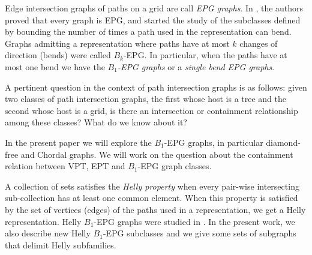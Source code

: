 \documentclass[9pt]{entcs}
\begin{document}
Edge intersection graphs of paths on a grid are call \textit{EPG graphs}. 
In \cite{golumbic2009}, the authors proved that every graph is EPG, and started the study of the subclasses
defined by bounding the number of times a path used in the representation can bend.  Graphs admitting a representation
where  paths  have at most $k$ changes of direction  (bends) were called $B_k$-EPG. 
 In particular, when the paths have at most one bend we have the \textit{ $B_1$-EPG graphs} or a \textit{single bend EPG graphs}.
 

 

 
 A pertinent question in the context of path intersection graphs is as follows: given two classes of path intersection graphs,
 the first whose host is a tree and the second whose host is a grid,  is there an intersection or containment relationship among these classes? What do we know about it?




In the present paper we will explore the $B_1$-EPG graphs, in particular diamond-free and Chordal graphs. We will work on the question about the containment
relation between  VPT, EPT and $B_1$-EPG graph classes.


 A collection  of sets satisfies the \textit{Helly property} when every pair-wise intersecting sub-collection  has at least one common element. When this property
 is satisfied by the set of vertices (edges) of the paths used in a representation, we get a Helly representation.  Helly $B_1$-EPG graphs were studied
 in \cite{bornstein2019complexity}.                                     
In the present work,  we also  describe new  Helly $B_1$-EPG  subclasses %
and we give some sets of subgraphs that delimit Helly subfamilies.   
\end{document}
